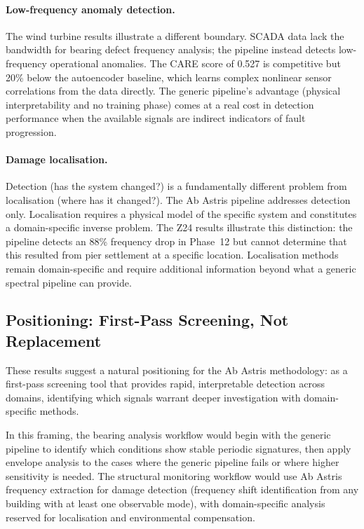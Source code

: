 \documentclass[11pt,a4paper]{article}
\begin{document}
\paragraph{Low-frequency anomaly detection.} The wind turbine results illustrate a different boundary. SCADA data lack the bandwidth for bearing defect frequency analysis; the pipeline instead detects low-frequency operational anomalies. The CARE score of 0.527 is competitive but 20\% below the autoencoder baseline, which learns complex nonlinear sensor correlations from the data directly. The generic pipeline's advantage (physical interpretability and no training phase) comes at a real cost in detection performance when the available signals are indirect indicators of fault progression.

\paragraph{Damage localisation.} Detection (has the system changed?) is a fundamentally different problem from localisation (where has it changed?). The Ab Astris pipeline addresses detection only. Localisation requires a physical model of the specific system and constitutes a domain-specific inverse problem. The Z24 results illustrate this distinction: the pipeline detects an 88\% frequency drop in Phase~12 but cannot determine that this resulted from pier settlement at a specific location. Localisation methods remain domain-specific and require additional information beyond what a generic spectral pipeline can provide.

\subsection{Positioning: First-Pass Screening, Not Replacement}
\label{sec:positioning}

These results suggest a natural positioning for the Ab Astris methodology: as a first-pass screening tool that provides rapid, interpretable detection across domains, identifying which signals warrant deeper investigation with domain-specific methods.

In this framing, the bearing analysis workflow would begin with the generic pipeline to identify which conditions show stable periodic signatures, then apply envelope analysis to the cases where the generic pipeline fails or where higher sensitivity is needed. The structural monitoring workflow would use Ab Astris frequency extraction for damage detection (frequency shift identification from any building with at least one observable mode), with domain-specific analysis reserved for localisation and environmental compensation.
\end{document}
